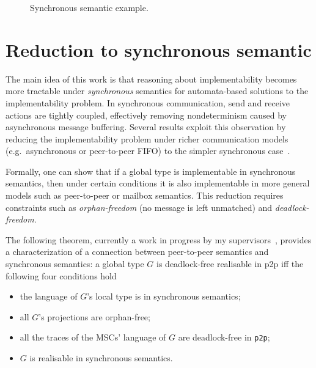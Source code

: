 \begin{figure}[!ht]
    \centering
      \begin{msc}[draw frame=none, draw head=none, msc keyword=, 
                  head height=0px, label distance=0.5ex, 
                  foot height=0px, foot distance=0px]{}

          \nextlevel
      \end{msc}
  \caption{Synchronous semantic example.}
  \label{fig:sync}
\end{figure}

\section{Reduction to synchronous semantic}
The main idea of this work is that reasoning about implementability 
becomes more tractable under \emph{synchronous} 
semantics for automata-based solutions to the implementability problem. 
In synchronous communication, send and receive actions 
are tightly coupled, effectively removing nondeterminism 
caused by asynchronous message buffering. Several results exploit this 
observation by reducing the implementability problem under richer 
communication models (e.g.\ asynchronous or peer-to-peer FIFO) to the 
simpler synchronous case~\cite{alur2005realizability,di2023partial}.

Formally, one can show that if a global type is implementable in 
synchronous semantics, then under certain conditions it is also 
implementable in more general models such as peer-to-peer or mailbox 
semantics. This reduction requires constraints such as 
\emph{orphan-freedom} (no message is left unmatched) and
\emph{deadlock-freedom}.  

The following theorem, currently a work in progress by my 
supervisors~\cite[Theorem 5.3]{di2025realisability}, 
provides a characterization of a connection between 
peer-to-peer semantics and synchronous semantics:
a global type $G$ is deadlock-free realisable in p2p iff
the following four conditions hold
\begin{itemize}
  \item the language of $G$'s local type is in synchronous semantics;
  \item all $G$'s projections are orphan-free;
  \item all the traces of the MSCs' language of $G$ are deadlock-free
  in \verb|p2p|;
  \item $G$ is realisable in synchronous semantics.
\end{itemize}

